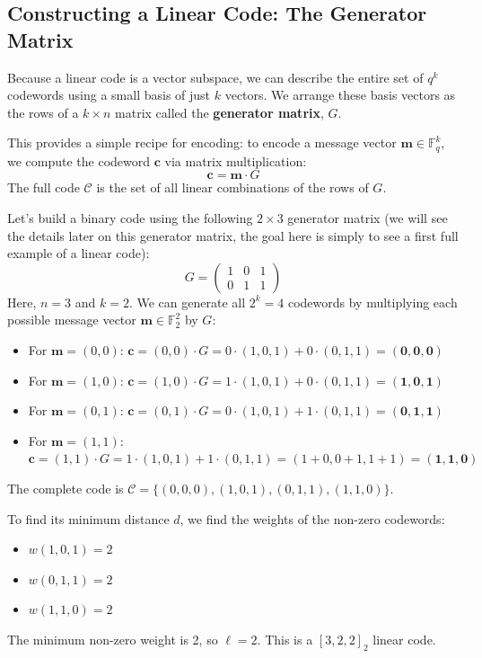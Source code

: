 \documentclass{article}
\begin{document}
\subsection{Constructing a Linear Code: The Generator Matrix}
Because a linear code is a vector subspace, we can describe the entire set of $q^k$ codewords using a small basis of just $k$ vectors. We arrange these basis vectors as the rows of a $k \times n$ matrix called the \textbf{generator matrix}, $G$.

This provides a simple recipe for encoding: to encode a message vector $\mathbf{m} \in \mathbb{F}_q^k$, we compute the codeword $\mathbf{c}$ via matrix multiplication:
\[
\mathbf{c} = \mathbf{m} \cdot G
\]
The full code $\mathcal{C}$ is the set of all linear combinations of the rows of $G$.

\begin{tcolorbox}[title={Example: Constructing a $[3, 2, 2]_2$ Linear Code}]

Let's build a binary code using the following $2 \times 3$ generator matrix (we will see the details later on this generator matrix, the goal here is simply to see a first full example of a linear code):
$$
G = \begin{pmatrix} 1 & 0 & 1 \\ 0 & 1 & 1 \end{pmatrix}
$$
Here, $n=3$ and $k=2$. We can generate all $2^k = 4$ codewords by multiplying each possible message vector $\mathbf{m} \in \mathbb{F}_2^2$ by $G$:

\begin{itemize}
    \item For $\mathbf{m} = (0, 0)$: $\mathbf{c} = (0,0) \cdot G = 0 \cdot (1,0,1) + 0 \cdot (0,1,1) = \mathbf{(0,0,0)}$
    \item For $\mathbf{m} = (1, 0)$: $\mathbf{c} = (1,0) \cdot G = 1 \cdot (1,0,1) + 0 \cdot (0,1,1) = \mathbf{(1,0,1)}$
    \item For $\mathbf{m} = (0, 1)$: $\mathbf{c} = (0,1) \cdot G = 0 \cdot (1,0,1) + 1 \cdot (0,1,1) = \mathbf{(0,1,1)}$
    \item For $\mathbf{m} = (1, 1)$: $\mathbf{c} = (1,1) \cdot G = 1 \cdot (1,0,1) + 1 \cdot (0,1,1) = (1+0, 0+1, 1+1) = \mathbf{(1,1,0)}$
\end{itemize}

The complete code is $\mathcal{C} = \{ (0,0,0), (1,0,1), (0,1,1), (1,1,0) \}$.

To find its minimum distance $d$, we find the weights of the non-zero codewords:
\begin{itemize}
    \item $w(1,0,1) = 2$
    \item $w(0,1,1) = 2$
    \item $w(1,1,0) = 2$
\end{itemize}
The minimum non-zero weight is 2, so $\ell=2$. This is a $[3, 2, 2]_2$ linear code. 
\end{tcolorbox}
\end{document}
